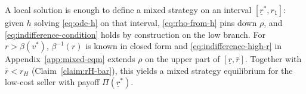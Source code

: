 A local solution is enough to define a mixed strategy on an interval
$[\underline{r}^{*},r_1]$: given $h$ solving \eqref{eq:ode-h} on that interval,
\eqref{eq:rho-from-h} pins down $\rho$, and \eqref{eq:indifference-condition}
holds by construction on the low branch.
For $r>\beta(v^{*})$, $\beta^{-1}(r)$ is known in closed form and
\eqref{eq:indifference-high-r} in Appendix~\ref{app:mixed-eqm} extends $\rho$ on
the upper part of $[\underline{r},\bar{r}]$.
Together with $\bar{r}<r_H$ (Claim~\ref{claim:rH-bar}), this yields a mixed
strategy equilibrium for the low-cost seller with payoff
$\Pi(\underline{r}^{*})$.
